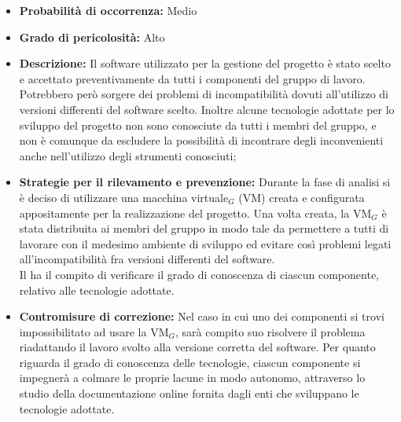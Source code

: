 \begin{itemize}
\item \textbf{Probabilità di occorrenza:} Medio
\item \textbf{Grado di pericolosità:} Alto
\item \textbf{Descrizione:} Il software utilizzato per la gestione del progetto è stato scelto e accettato preventivamente da tutti i componenti del gruppo di lavoro. Potrebbero però sorgere dei problemi di incompatibilità dovuti all'utilizzo di versioni differenti del software scelto. Inoltre alcune tecnologie adottate per lo sviluppo del progetto non sono conosciute da tutti i membri del gruppo, e non è comunque da escludere la possibilità di incontrare degli inconvenienti anche nell'utilizzo degli strumenti conosciuti;

\item \textbf{Strategie per il rilevamento e prevenzione:} Durante la fase di analisi si è deciso di utilizzare una macchina virtuale$_G$ (VM) creata e configurata appositamente per la realizzazione del progetto. Una volta creata, la VM$_G$ è stata distribuita ai membri del gruppo in modo tale da permettere a tutti di lavorare con il medesimo ambiente di sviluppo ed evitare così problemi legati all'incompatibilità fra versioni differenti del software. \\
Il \ruoloResponsabile{} ha il compito di verificare il grado di conoscenza di ciascun componente, relativo alle tecnologie adottate. 
\item \textbf{Contromisure di correzione:} Nel caso in cui uno dei componenti si trovi impossibilitato ad usare la VM$_G$, sarà compito suo risolvere il problema riadattando il lavoro svolto alla versione corretta del software.
Per quanto riguarda il grado di conoscenza delle tecnologie, ciascun componente si impegnerà a colmare le proprie lacune in modo autonomo, attraverso lo studio della documentazione online fornita dagli enti che sviluppano le tecnologie adottate.
\end{itemize}


